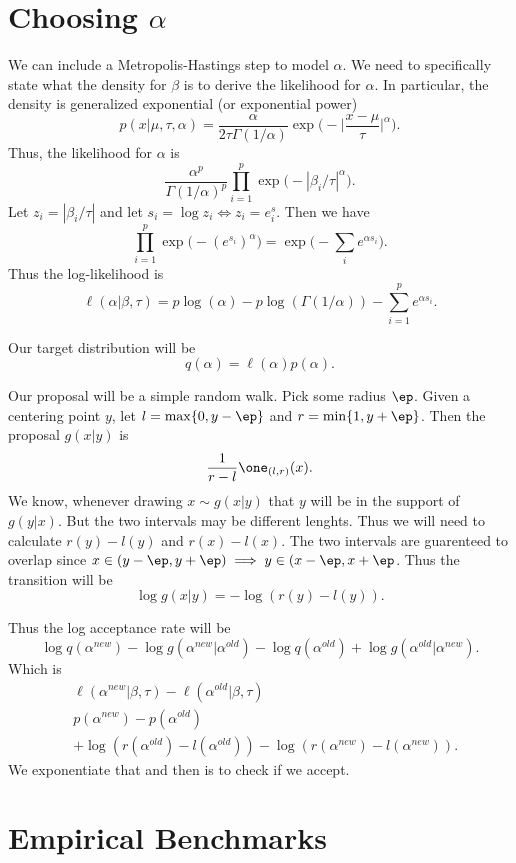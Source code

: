 \documentclass{article}
\begin{document}
\section{Choosing $\alpha$}

We can include a Metropolis-Hastings step to model $\alpha$.  We need to
specifically state what the density for $\beta$ is to derive the likelihood for
$\alpha$.  In particular, the density is generalized exponential (or exponential
power)
\[
p(x | \mu, \tau, \alpha) = \frac{\alpha}{2 \tau \Gamma(1/\alpha)} \exp \Big(
-\Big|\frac{x-\mu}{\tau}\Big|^\alpha \Big).
\]
Thus, the likelihood for $\alpha$ is
\[
\frac{\alpha^p}{\Gamma(1/\alpha)^p} \prod_{i=1}^p \exp \Big( - |\beta_i / \tau|^\alpha \Big).
\]
Let $z_i = |\beta_i / \tau|$ and let $s_i = \log z_i \iff z_i = e^s_i$.  Then we
have
\[
\prod_{i=1}^p \exp \Big( - (e^{s_i})^{\alpha} \Big) = \exp \Big( - \sum_{i}
e^{\alpha s_i} \Big).
\]
Thus the log-likelihood is
\[
\ell(\alpha | \beta, \tau) = p \log(\alpha) - p \log (\Gamma(1/\alpha)) - \sum_{i=1}^p e^{\alpha s_i}.
\]

Our target distribution will be 
\[
q(\alpha) = \ell(\alpha) p(\alpha).
\]

Our proposal will be a simple random walk.  Pick some radius $\ep$.  Given a
centering point $y$, let $l = \max \{0, y-\ep\}$ and $r = \min \{1,y+\ep\}$.
Then the proposal $g(x|y)$ is
\[
\frac{1}{r-l} \one_{(l,r)}(x).
\]
We know, whenever drawing $x \sim g(x|y)$ that $y$ will be in the support of
$g(y|x)$.  But the two intervals may be different lenghts.  Thus we will need to
calculate $r(y)-l(y)$ and $r(x)-l(x)$.  The two intervals are guarenteed to
overlap since $x \in (y-\ep, y+\ep) \implies y \in (x-\ep, x+\ep$.  Thus the
transition will be
\[
\log g(x|y) = - \log (r(y) - l(y)).
\]

Thus the log acceptance rate will be
\[
\log q(\alpha^{new}) - \log g(\alpha^{new} | \alpha^{old}) - \log
q(\alpha^{old}) + \log g(\alpha^{old} | \alpha^{new}).
\]
Which is
\begin{align*}
& \ell(\alpha^{new} | \beta, \tau) - \ell(\alpha^{old} | \beta, \tau) \\
& p(\alpha^{new}) - p(\alpha^{old}) \\
& + \log(r(\alpha^{old}) - l(\alpha^{old})) - \log(r(\alpha^{new}) - l(\alpha^{new})).
\end{align*}
We exponentiate that and then is to check if we accept.

\newpage

\section{Empirical Benchmarks}
\end{document}
